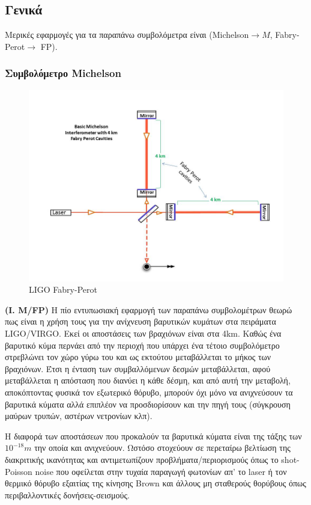 \documentclass[a4paper]{article}
\begin{document}
\subsection*{Γενικά}
Μερικές εφαρμογές για τα παραπάνω συμβολόμετρα είναι (Michelson$\rightarrow M$, Fabry-Perot$\rightarrow$ FP).

\subsubsection*{Συμβολόμετρο Michelson}

\begin{figure}
\includegraphics[width=0.8\linewidth]{ligo.jpg} 
\caption{ LIGO Fabry-Perot}
\label{fig:wrapfig}
\end{figure}
\textbf{(I. M/FP)} Η πίο εντυπωσιακή εφαρμογή των παραπάνω συμβολομέτρων θεωρώ πως είναι η χρήση τους για την ανίχνευση βαρυτικών κυμάτων στα πειράματα LIGO/VIRGO.
 Εκεί οι αποστάσεις των βραχιόνων είναι στα 4km. Καθώς ένα βαρυτικό κύμα περνάει από την περιοχή που υπάρχει ένα τέτοιο συμβολόμετρο στρεβλώνει τον χώρο γύρω του και ως εκτούτου μεταβάλλεται το μήκος των βραχιόνων.
	 Έτσι η ένταση των συμβαλλόμενων δεσμών μεταβάλλεται, αφού μεταβάλλεται η απόσταση που διανύει η κάθε δέσμη, και από αυτή την μεταβολή, αποκόπτοντας φυσικά τον εξωτερικό θόρυβο, μπορούν όχι μόνο να ανιχνεύσουν τα βαρυτικά κύματα αλλά επιπλέον να προσδιορίσουν και την πηγή τους (σύγκρουση μαύρων τρυπών, αστέρων νετρονίων κλπ). 
	
	Η διαφορά των αποστάσεων που προκαλούν τα βαρυτικά κύματα είναι της τάξης των $10^{-18}m$ την οποία και ανιχνεύουν. Ωστόσο στοχεύουν σε περεταίρω βελτίωση της διακριτικής ικανότητας και αντιμετωπίζουν προβλήματα/περιορισμούς όπως το shot-Poisson noise που οφείλεται στην τυχαία παραγωγή φωτονίων απ' το laser ή τον θερμικό θόρυβο εξαιτίας της κίνησης Brown και άλλους μη σταθερούς θορύβους όπως περιβαλλοντικές δονήσεις-σεισμούς.
	
\end{document}
